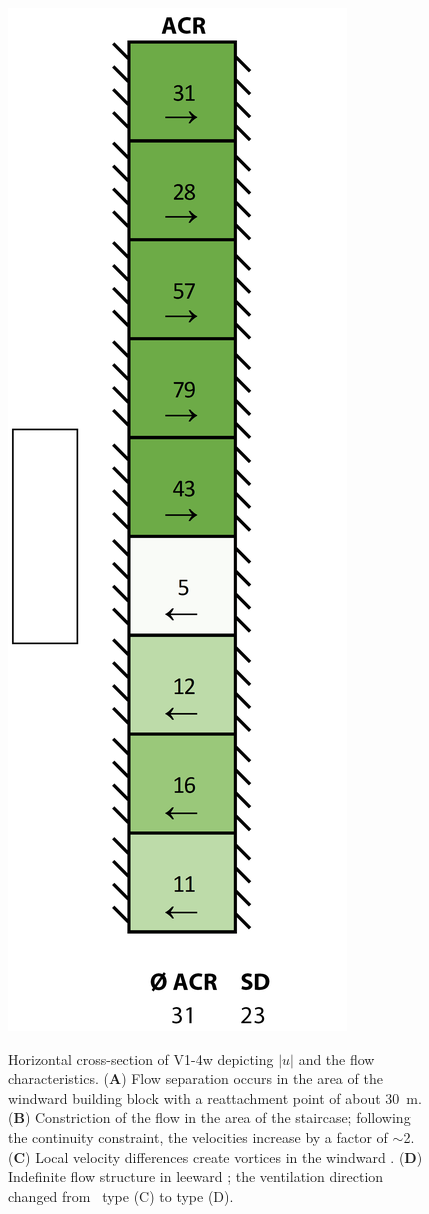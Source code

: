 \begin{figure}[!hb]
{	\includegraphics[width=0.14\textheight, trim= 0.00cm -2.7cm 5cm 0.45cm, clip]{images/ACR/ACR_V1-4w}}	
	\captionsetup{format=plain}
	\caption[Flow characteristics of V1-4w]{Horizontal cross-section of V1-4w depicting  $|u|$ and the flow characteristics. (\textbf{A}) Flow separation occurs in the area of the windward building block with a reattachment point of about \SI{30}{m}. (\textbf{B}) Constriction of the flow in the area of the staircase; following the continuity constraint,  the velocities increase by a factor of $\sim$\num{2}. (\textbf{C}) Local velocity differences create vortices in the windward \CR. (\textbf{D}) Indefinite flow structure in leeward \CR; the ventilation direction changed from \CR\ type (C) to type (D).}
	\label{fig:V1-4w_flow_field}	
\end{figure}
\enlargethispage*{1.0cm}



